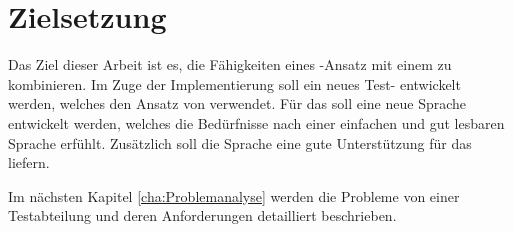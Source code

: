 
\section{Zielsetzung}

Das Ziel dieser Arbeit ist es, die Fähigkeiten eines -Ansatz mit einem   zu kombinieren. Im Zuge der Implementierung soll ein neues Test- entwickelt werden, welches den Ansatz von  verwendet. Für das  soll eine neue Sprache entwickelt werden, welches die Bedürfnisse nach einer einfachen und gut lesbaren Sprache erfühlt. Zusätzlich soll die Sprache eine gute Unterstützung für das  liefern.

\SuperPar
Im nächsten Kapitel \ref{cha:Problemanalyse} werden die Probleme von einer Testabteilung und deren Anforderungen detailliert beschrieben.